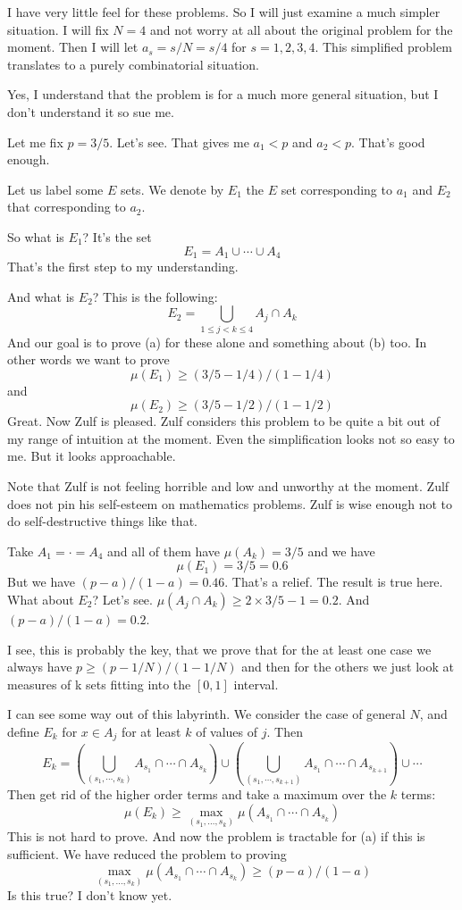 \documentclass{amsart}
\begin{document}
I have very little feel for these problems.  So I will just examine a much simpler situation.  I will fix $N=4$ and not worry at all about the original problem for the moment. Then I will let $a_s = s/N = s/4$ for $s=1,2,3,4$.  This simplified problem translates to a purely combinatorial situation.

Yes, I understand that the problem is for a much more general situation, but I don't understand it so sue me.

Let me fix $p=3/5$.  Let's see.  That gives me $a_1<p$ and $a_2<p$.  That's good enough.

Let us label some $E$ sets.  We denote by $E_1$ the $E$ set corresponding to $a_1$ and $E_2$ that corresponding to $a_2$.  

So what is $E_1$?  It's the set
\[
E_1 = A_1 \cup \cdots \cup A_4
\]
That's the first step to my understanding.  

And what is $E_2$?  This is the following:
\[
E_2 = \bigcup_{1\le j<k \le 4} A_j \cap A_k
\]
And our goal is to prove (a) for these alone and something about (b) too.  In other words we want to prove
\[
\mu(E_1) \ge (3/5-1/4)/(1-1/4)
\]
and
\[
\mu(E_2) \ge (3/5-1/2)/(1-1/2)
\]
Great.  Now Zulf is pleased.  Zulf considers this problem to be quite a bit out of my range of intuition at the moment.  Even the simplification looks not so easy to me.  But it looks approachable.   

Note that Zulf is not feeling horrible and low and unworthy at the moment.  Zulf does not pin his self-esteem on mathematics problems.  Zulf is wise enough not to do self-destructive things like that.

Take $A_1=\cdot=A_4$ and all of them have $\mu(A_k)=3/5$ and we have
\[
\mu(E_1)= 3/5=0.6
\]
But we have $(p-a)/(1-a) = 0.46$.  That's a relief.  The result is true here. What about $E_2$?  Let's see.  $\mu(A_j\cap A_k) \ge 2\times 3/5-1 = 0.2$.  And $(p-a)/(1-a)= 0.2$.

I see, this is probably the key, that we prove that for the at least one case we always have $p \ge (p-1/N)/(1-1/N)$ and then for the others we just look at measures of k sets fitting into the $[0,1]$ interval.

I can see some way out of this labyrinth.  We consider the case of general $N$, and define $E_k$ for $x\in A_j$ for at least $k$ of values of $j$.  Then
\[
E_k = (\bigcup_{(s_1,\cdots,s_k)} A_{s_1} \cap \cdots \cap A_{s_k}) \cup ( \bigcup_{(s_1,\cdots,s_{k+1})} A_{s_1} \cap \cdots \cap A_{s_{k+1}} ) \cup \cdots
\]
Then get rid of the higher order terms and take a maximum over the $k$ terms:
\[
\mu(E_k) \ge \max_{(s_1,\dots,s_k)} \mu(A_{s_1} \cap \cdots \cap A_{s_k})
\]
This is not hard to prove.  And now the problem is tractable for (a) if this is sufficient.  We have reduced the problem to proving
\[
\max_{(s_1,\dots,s_k)} \mu(A_{s_1} \cap \cdots \cap A_{s_k}) \ge (p-a)/(1-a)
\]
Is this true? I don't know yet.
\end{document}
